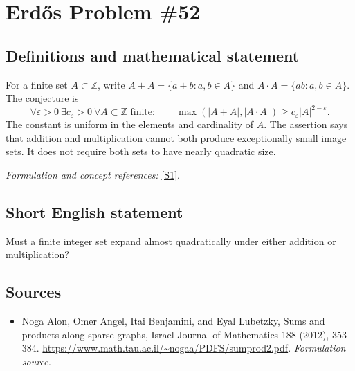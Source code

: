 \documentclass[11pt]{article}
\begin{document}
\section*{\texorpdfstring{Erdős Problem \#52}{Erdős Problem \#52}}\label{1904}
\subsection{Definitions and mathematical statement}
For a finite set $A\subset{\mathbb{Z}}$, write $A+A=\{a+b:a,b\in A\}$ and $A\cdot A=\{ab:a,b\in A\}$. The conjecture is
\[
 \forall\varepsilon>0\ \exists c_\varepsilon>0\ \forall A\subset{\mathbb{Z}}\text{ finite}:\qquad
 \max(|A+A|,|A\cdot A|)\ge c_\varepsilon|A|^{2-\varepsilon}.
\]
The constant is uniform in the elements and cardinality of $A$. The assertion says that addition and multiplication cannot both produce exceptionally small image sets. It does not require both sets to have nearly quadratic size.
\par\smallskip\textit{Formulation and concept references:} \href{https://www.math.tau.ac.il/~nogaa/PDFS/sumprod2.pdf}{[S1]}.

\subsection{Short English statement}
Must a finite integer set expand almost quadratically under either addition or multiplication?
\subsection{Sources}
\begin{itemize}
\item[S1]Noga Alon, Omer Angel, Itai Benjamini, and Eyal Lubetzky, Sums and products along sparse graphs, Israel Journal of Mathematics 188 (2012), 353-384.
\url{https://www.math.tau.ac.il/~nogaa/PDFS/sumprod2.pdf}.
\textit{Formulation source.}
\end{itemize}
\end{document}
